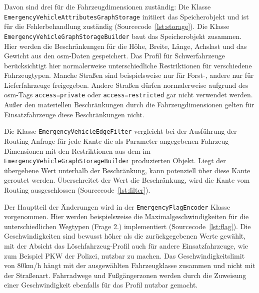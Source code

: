 Davon sind drei für die Fahrzeugdimensionen zuständig:
\newline
Die Klasse \texttt{EmergencyVehicleAttributesGraphStorage} initiiert das Speicherobjekt und ist für die Fehlerbehandlung zuständig (Sourcecode~\ref{lst:storage}).
\newline
Die Klasse \texttt{EmergencyVehicleGraphStorageBuilder} baut das Speicherobjekt zusammen.
Hier werden die Beschränkungen für die Höhe, Breite, Länge, Achslast und das Gewicht aus den \gls{osm}-Daten gespeichert.
Das Profil für Schwerfahrzeuge berücksichtigt hier normalerweise unterschiedliche Restriktionen für verschiedene Fahrzeugtypen.
Manche Straßen sind beispielsweise nur für Forst-, andere nur für Lieferfahrzeuge freigegeben.
Andere Straßen dürfen normalerweise aufgrund des \gls{osm}-Tags \texttt{access=private} oder \texttt{access=restricted} gar nicht verwendet werden.
Außer den materiellen Beschränkungen durch die Fahrzeugdimensionen gelten für Einsatzfahrzeuge diese Beschränkungen nicht.

Die Klasse \texttt{EmergencyVehicleEdgeFilter} vergleicht bei der Ausführung der Routing-Anfrage für jede Kante die als Parameter angegebenen Fahrzeug-Dimensionen mit den Restriktionen aus dem im \texttt{EmergencyVehicleGraphStorageBuilder} produzierten Objekt.
Liegt der übergebene Wert unterhalb der Beschränkung, kann potenziell über diese Kante geroutet werden.
Überschreitet der Wert die Beschränkung, wird die Kante vom Routing ausgeschlossen (Sourcecode~\ref{lst:filter}).


Der Hauptteil der Änderungen wird in der \texttt{EmergencyFlagEncoder} Klasse vorgenommen.
Hier werden beispielsweise die Maximalgeschwindigkeiten für die unterschiedlichen Wegtypen (Frage 2.) implementiert (Sourcecode~\ref{lst:flag}).
Die Geschwindigkeiten sind bewusst höher als die zurückgegebenen Werte gewählt, mit der Absicht das Löschfahrzeug-Profil auch für andere Einsatzfahrzeuge, wie zum Beispiel PKW der Polizei, nutzbar zu machen.
Das Geschwindigkeitslimit von 80km/h hängt mit der ausgewählten Fahrzeugklasse zusammen und nicht mit der Straßenart.
Fahrradwege und Fußgängerzonen werden durch die Zuweisung einer Geschwindigkeit ebenfalls für das Profil nutzbar gemacht.

